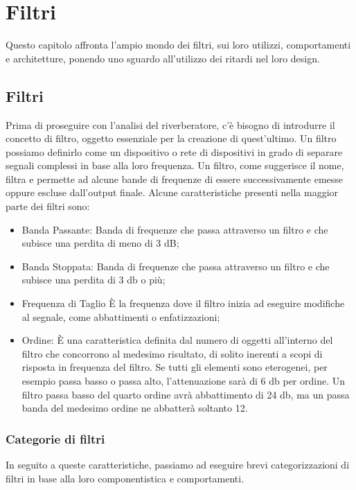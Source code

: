 
\chapter{Filtri}
\label{chp:Filtri}

Questo capitolo affronta l'ampio mondo dei filtri, sui loro utilizzi, comportamenti e architetture, ponendo uno sguardo all'utilizzo dei ritardi nel loro design.

\section{Filtri}
Prima di proseguire con l’analisi del riverberatore, c’è bisogno di introdurre il concetto di filtro, oggetto essenziale  per la creazione di quest’ultimo.
Un filtro possiamo definirlo come un dispositivo o rete di dispositivi in grado di separare segnali complessi in base alla loro frequenza. Un filtro, come suggerisce il nome, filtra e permette ad alcune bande di frequenze di essere successivamente emesse oppure escluse dall’output finale. 
Alcune caratteristiche presenti nella maggior parte dei filtri sono:
\begin{itemize}
\item Banda Passante:
Banda di frequenze che passa attraverso un filtro e che subisce una perdita di meno di 3 dB;
\item Banda Stoppata:
Banda di frequenze che passa attraverso un filtro e che subisce una perdita di 3 db o più; 
\item Frequenza di Taglio
È la frequenza dove il filtro inizia ad eseguire modifiche al segnale, come abbattimenti o enfatizzazioni;
\item Ordine:
È una caratteristica definita dal numero di oggetti all’interno del filtro che concorrono al medesimo risultato, di solito inerenti a scopi di risposta in frequenza del filtro. Se tutti gli elementi sono eterogenei, per esempio passa basso o passa alto, l’attenuazione sarà di 6 db per ordine. Un filtro passa basso del quarto ordine avrà abbattimento di 24 db, ma un passa banda del medesimo ordine ne abbatterà soltanto 12.
\end{itemize}
\medskip
\subsection{Categorie di filtri}
In seguito a queste caratteristiche, passiamo ad eseguire brevi categorizzazioni di filtri in base alla loro componentistica e comportamenti.

